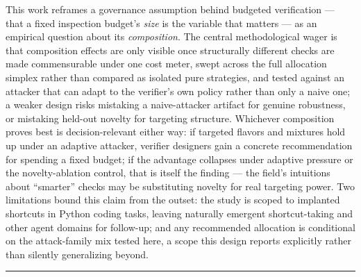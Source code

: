 \documentclass[11pt]{article}
\begin{document}
This work reframes a governance assumption behind budgeted verification --- that a fixed inspection budget's \emph{size} is the variable that matters --- as an empirical question about its \emph{composition}. The central methodological wager is that composition effects are only visible once structurally different checks are made commensurable under one cost meter, swept across the full allocation simplex rather than compared as isolated pure strategies, and tested against an attacker that can adapt to the verifier's own policy rather than only a naive one; a weaker design risks mistaking a naive-attacker artifact for genuine robustness, or mistaking held-out novelty for targeting structure. Whichever composition proves best is decision-relevant either way: if targeted flavors and mixtures hold up under an adaptive attacker, verifier designers gain a concrete recommendation for spending a fixed budget; if the advantage collapses under adaptive pressure or the novelty-ablation control, that is itself the finding --- the field's intuitions about ``smarter'' checks may be substituting novelty for real targeting power. Two limitations bound this claim from the outset: the study is scoped to implanted shortcuts in Python coding tasks, leaving naturally emergent shortcut-taking and other agent domains for follow-up; and any recommended allocation is conditional on the attack-family mix tested here, a scope this design reports explicitly rather than silently generalizing beyond.

\vspace{1em}
\hrule
\vspace{1em}
\end{document}
